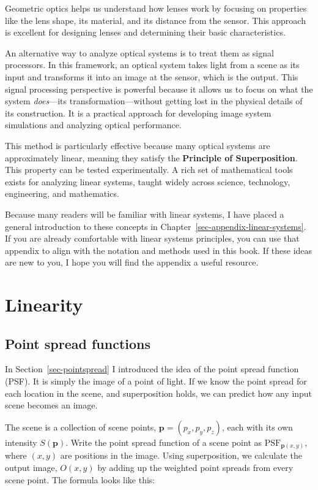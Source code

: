 \documentclass[
  letterpaper,
]{book}
\begin{document}
Geometric optics helps us understand how lenses work by focusing on
properties like the lens shape, its material, and its distance from the
sensor. This approach is excellent for designing lenses and determining
their basic characteristics.

An alternative way to analyze optical systems is to treat them as signal
processors. In this framework, an optical system takes light from a
scene as its input and transforms it into an image at the sensor, which
is the output. This signal processing perspective is powerful because it
allows us to focus on what the system \emph{does}---its
transformation---without getting lost in the physical details of its
construction. It is a practical approach for developing image system
simulations and analyzing optical performance.

This method is particularly effective because many optical systems are
approximately linear, meaning they satisfy the \textbf{Principle of
Superposition}. This property can be tested experimentally. A rich set
of mathematical tools exists for analyzing linear systems, taught widely
across science, technology, engineering, and mathematics.

Because many readers will be familiar with linear systems, I have placed
a general introduction to these concepts in
Chapter~\ref{sec-appendix-linear-systems}. If you are already
comfortable with linear systems principles, you can use that appendix to
align with the notation and methods used in this book. If these ideas
are new to you, I hope you will find the appendix a useful resource.

\section{Linearity}\label{linearity}

\subsection{Point spread functions}\label{sec-pointspread-2}

In Section~\ref{sec-pointspread} I introduced the idea of the point
spread function (PSF). It is simply the image of a point of light. If we
know the point spread for each location in the scene, and superposition
holds, we can predict how any input scene becomes an image.

The scene is a collection of scene points,
\(\mathbf{p} = (p_x, p_y, p_z)\), each with its own intensity
\(S(\mathbf{p})\). Write the point spread function of a scene point as
\(\text{PSF}_{\mathbf{p}(x, y)}\), where \((x, y)\) are positions in the
image. Using superposition, we calculate the output image, \(O(x,y)\) by
adding up the weighted point spreads from every scene point. The formula
looks like this:
\end{document}
